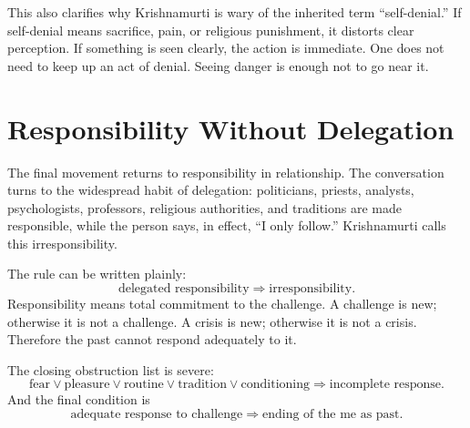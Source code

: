 \begin{figure}
\centering
{}
\end{figure}

This also clarifies why Krishnamurti is wary of the inherited term ``self-denial.'' If self-denial means sacrifice, pain, or religious punishment, it distorts clear perception. If something is seen clearly, the action is immediate. One does not need to keep up an act of denial. Seeing danger is enough not to go near it.

\section{Responsibility Without Delegation}

The final movement returns to responsibility in relationship. The conversation turns to the widespread habit of delegation: politicians, priests, analysts, psychologists, professors, religious authorities, and traditions are made responsible, while the person says, in effect, ``I only follow.'' Krishnamurti calls this irresponsibility.

The rule can be written plainly:
\begin{equation}
\text{delegated responsibility}
\Longrightarrow
\text{irresponsibility}.
\end{equation}
Responsibility means total commitment to the challenge. A challenge is new; otherwise it is not a challenge. A crisis is new; otherwise it is not a crisis. Therefore the past cannot respond adequately to it.

The closing obstruction list is severe:
\begin{equation}
\text{fear}
\lor
\text{pleasure}
\lor
\text{routine}
\lor
\text{tradition}
\lor
\text{conditioning}
\Longrightarrow
\text{incomplete response}.
\end{equation}
And the final condition is
\begin{equation}
\text{adequate response to challenge}
\Longrightarrow
\text{ending of the me as past}.
\end{equation}

